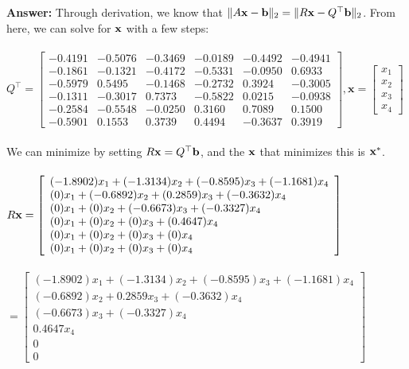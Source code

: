 \documentclass[12pt]{article}
\newcommand{\bfx}{{\bf x}}
\newcommand{\bfb}{{\bf b}}
\begin{document}
\bigskip
\noindent\textbf{Answer:} Through derivation, we know that $\|A \mathbf{x}-\mathbf{b}\|_{2}=\|R\bfx -Q^{\top}\bfb\|_2$. From here, we can solve for $\bfx$ with a few steps:
\\~\\$Q^{\top}=\left[\begin{array}{cccccc}{-0.4191} & {-0.5076} & {-0.3469} & {-0.0189} & {-0.4492} & {-0.4941} \\ {-0.1861} & {-0.1321} & {-0.4172} & {-0.5331} & {-0.0950} & {0.6933} \\ {-0.5979} & {0.5495} & {-0.1468} & {-0.2732} & {0.3924} & {-0.3005} \\ {-0.1311} & {-0.3017} & {0.7373} & {-0.5822} & {0.0215} & {-0.0938} \\ {-0.2584} & {-0.5548} & {-0.0250} & {0.3160} & {0.7089} & {0.1500} \\ {-0.5901} & {0.1553} & {0.3739} & {0.4494} & {-0.3637} & {0.3919}\end{array}\right], \mathbf{x}=\left[\begin{array}{l}{x_1} \\ {x_2} \\ {x_3} \\ {x_4}\end{array}\right]$
\\~\\We can minimize by setting $R\bfx=Q^{\top}\bfb$, and the $\bfx$ that minimizes this is $\bfx^{*}$.
\\~\\$R\bfx=\left[\begin{array}{l}{(-1.8902)x_1+(-1.3134)x_2+(-0.8595)x_3+(-1.1681)x_4} \\ {(0)x_1+(-0.6892)x_2+(0.2859)x_3+(-0.3632)x_4} \\ {(0)x_1+(0)x_2+(-0.6673)x_3+(-0.3327)x_4} \\ {(0)x_1+(0)x_2+(0)x_3+(0.4647)x_4} \\ {(0)x_1+(0)x_2+(0)x_3+(0)x_4} \\ {(0)x_1+(0)x_2+(0)x_3+(0)x_4}\end{array}\right]$
\\~\\$=\left[\begin{array}{l}{(-1.8902)x_1+(-1.3134)x_2+(-0.8595)x_3+(-1.1681)x_4} \\ {(-0.6892)x_2+0.2859x_3+(-0.3632)x_4} \\ {(-0.6673)x_3+(-0.3327)x_4} \\ {0.4647x_4} \\ {0} \\ {0}\end{array}\right]$
\end{document}
